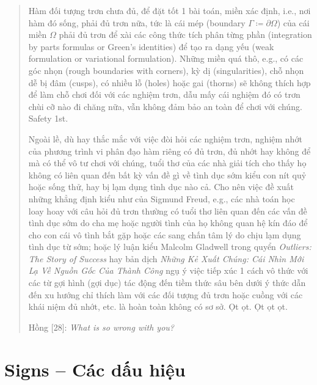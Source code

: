 \documentclass[12pt,oneside]{book}
\begin{document}
\begin{quote}
	Hàm đối tượng trơn chưa đủ, để đặt tốt 1 bài toán, miền xác định, i.e., nơi hàm đó sống, phải đủ trơn nữa, tức là cái mép (boundary $\Gamma\coloneqq\partial\Omega$) của cái miền $\Omega$ phải đủ trơn để xài các công thức tích phân từng phần (integration by parts formulas or Green's identities) để tạo ra dạng yếu (weak formulation or variational formulation). Những miền quá thô, e.g., có các góc nhọn (rough boundaries with corners), kỳ dị (singularities), chỗ nhọn dễ bị đâm (cusps), có nhiều lỗ (holes) hoặc gai (thorns) sẽ không thích hợp để làm chỗ chơi đối với các nghiệm trơn, dẫu mấy cái nghiệm đó có trơn chùi cỡ nào đi chăng nữa, vẫn không đảm bảo an toàn để chơi với chúng. Safety 1st.
	
	Ngoài lề, dù hay thắc mắc với việc đòi hỏi các nghiệm trơn, nghiệm nhớt của phương trình vi phân đạo hàm riêng có đủ trơn, đủ nhớt hay không để mà có thể vô tư chơi với chúng, tuổi thơ của các nhà giải tích cho thấy họ không có liên quan đến bất kỳ vấn đề gì về tình dục sớm kiểu con nít quỷ hoặc sống thử, hay bị lạm dụng tình dục nào cả. Cho nên việc đề xuất những khẳng định kiểu như của {\sc Sigmund Freud}, e.g., các nhà toán học loay hoay với câu hỏi đủ trơn thường có tuổi thơ liên quan đến các vấn đề tình dục sớm do cha mẹ hoặc người tình của họ không quan hệ kín đáo để cho con cái vô tình bắt gặp hoặc các sang chấn tâm lý do chịu lạm dụng tình dục từ sớm; hoặc lý luận kiểu {\sc Malcolm Gladwell} trong quyển {\it Outliers: The Story of Success} \cite{Gladwell2008} hay bản dịch {\it Những Kẻ Xuất Chúng: Cái Nhìn Mới Lạ Về Nguồn Gốc Của Thành Công} \cite{Gladwell_outlier} ngụ ý việc tiếp xúc 1 cách vô thức với các từ gợi hình (gợi dục) tác động đến tiềm thức sâu bên dưới ý thức dẫn đến xu hướng chỉ thích làm với các đối tượng đủ trơn hoặc cuồng với các khái niệm đủ nhớt, etc. là hoàn toàn không có sơ sở. Ọt ọt. Ọt ọt ọt.
	
	{\sf Hồng [28]}: {\it What is so wrong with you?}
\end{quote}

\section{Signs -- Các dấu hiệu}
\end{document}
